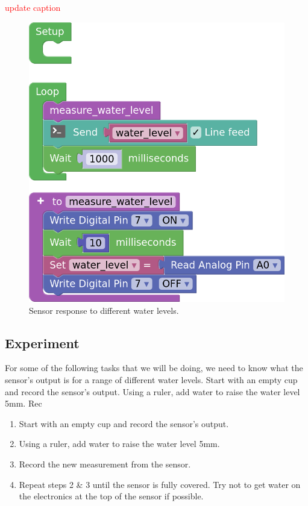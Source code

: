 \documentclass[12pt]{article}
\begin{document}
\textcolor{red}{update caption}

\begin{figure}[H]
	\begin{center}
		\includegraphics[scale=0.3]{p_water-level-sensor}
		\caption{Sensor response to different water levels.}
		\label{p:water_sensor_simple}
	\end{center}
\end{figure}













\subsection{Experiment}

For some of the following tasks that we will be doing, we need to know what the sensor's output is for a range of different water levels. Start with an empty cup and record the sensor's output. Using a ruler, add water to raise the water level 5mm. Rec

\begin{enumerate}
	\itemsep -1em
	\item Start with an empty cup and record the sensor's output.
	\item Using a ruler, add water to raise the water level 5mm.
	\item Record the new measurement from the sensor.
	\item Repeat steps 2 \& 3 until the sensor is fully covered. Try not to get water on the electronics at the top of the sensor if possible.
\end{enumerate}
\end{document}
